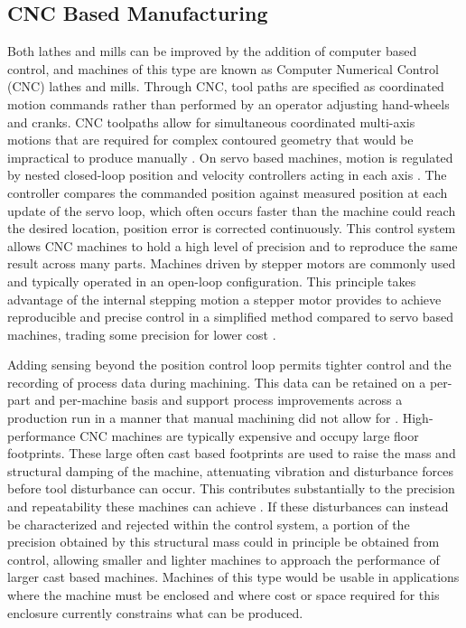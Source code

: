 \subsection{CNC Based Manufacturing}\label{Sect:cnc}
Both lathes and mills can be improved by the addition of computer based control, and machines of this type are known as Computer Numerical Control (CNC) lathes and mills. Through CNC, tool paths are specified as coordinated motion commands rather than performed by an operator adjusting hand-wheels and cranks. CNC toolpaths allow for simultaneous coordinated multi-axis motions that are required for complex contoured geometry that would be impractical to produce manually \cite{groover_fundamentals_2010,altintas_manufacturing_2012}. On servo based machines, motion is regulated by nested closed-loop position and velocity controllers acting in each axis \cite{altintas_manufacturing_2012}. The controller compares the commanded position against measured position at each update of the servo loop, which often occurs faster than the machine could reach the desired location, position error is corrected continuously. This control system allows CNC machines to hold a high level of precision and to reproduce the same result across many parts. Machines driven by stepper motors are commonly used and typically operated in an open-loop configuration. This principle takes advantage of the internal stepping motion a stepper motor provides to achieve reproducible and precise control in a simplified method compared to servo based machines, trading some precision for lower cost \cite{henke_modeling_2013,ricci_simple_2018,binfet_implementation_2026}.

Adding sensing beyond the position control loop permits tighter control and the recording of process data during machining. This data can be retained on a per-part and per-machine basis and support process improvements across a production run in a manner that manual machining did not allow for \cite{tao_data-driven_2018,wong_technical_2020,altintas_manufacturing_2012, civiello_characterization_2026}.
High-performance CNC machines are typically expensive and occupy large floor footprints. These large often cast based footprints are used to raise the mass and structural damping of the machine, attenuating vibration and disturbance forces before tool disturbance can occur. This contributes substantially to the precision and repeatability these machines can achieve \cite{altintas_manufacturing_2012}. If these disturbances can instead be characterized and rejected within the control system, a portion of the precision obtained by this structural mass could in principle be obtained from control, allowing smaller and lighter machines to approach the performance of larger cast based machines. Machines of this type would be usable in applications where the machine must be enclosed and where cost or space required for this enclosure currently constrains what can be produced. 

